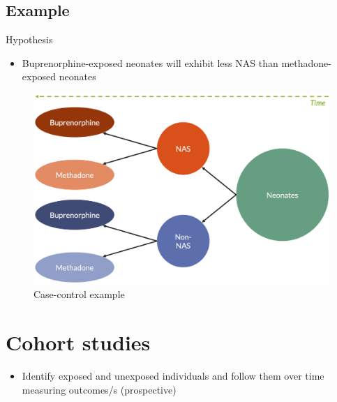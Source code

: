 \documentclass[
]{book}
\providecommand{\tightlist}{%
  \setlength{\itemsep}{0pt}\setlength{\parskip}{0pt}}
\begin{document}
\hypertarget{example-2}{%
\subsection{Example}\label{example-2}}

Hypothesis

\begin{itemize}
\tightlist
\item
  Buprenorphine-exposed neonates will exhibit less NAS than methadone-exposed neonates
\end{itemize}

\begin{figure}

{\centering \includegraphics[width=1\linewidth]{img/study_design/case_control_example} 

}

\caption{Case-control example}\label{fig:unnamed-chunk-7}
\end{figure}

\hypertarget{cohort-studies}{%
\section{Cohort studies}\label{cohort-studies}}

\begin{itemize}
\tightlist
\item
  Identify exposed and unexposed individuals and follow them over time measuring outcomes/s (prospective)
\end{itemize}
\end{document}
